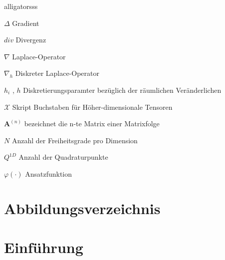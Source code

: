 \documentclass[12pt,a4paper]{scrartcl}
\numberwithin{equation}{section}
\begin{document}
\begin{labeling}{alligatorsss \quad \quad }
\item [$\Delta$] Gradient
\item [$div$] Divergenz
\item [$\nabla$] Laplace-Operator
\item [$\nabla_h$] Diskreter Laplace-Operator
\item [$h_i$ , $h$] Diskretierungsparamter bezüglich der räumlichen Veränderlichen
\item [$\pmb{\mathscr{X}}$] Skript Buchstaben für Höher-dimensionale Tensoren
\item [$\textbf{A}^{(n)}$] bezeichnet die n-te Matrix einer Matrixfolge
\item [$N$] Anzahl der Freiheitsgrade pro Dimension
\item [$Q^{1D}$] Anzahl der Quadraturpunkte
\item [$\varphi(\cdot)$] Ansatzfunktion

\end{labeling}






\newpage
\setcounter{page}{2}
\renewcommand{\listfigurename}{}
\section*{Abbildungsverzeichnis}
\listoffigures









\newpage
\pagestyle{plain}



\setcounter{page}{1}
\pagestyle{fancy}
\section{Einführung}

\end{document}
